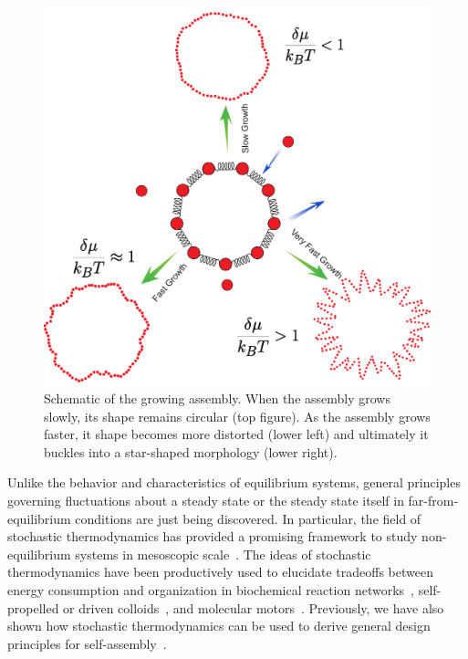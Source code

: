 \documentclass[amsmath,preprintnumbers,10pt,nofootinbib,prl,twocolumn]{revtex4-1}
\begin{document}
\begin{figure}[tbb]
\centering
\includegraphics[scale=0.35]{particleinaringschematicFig1.pdf}
\caption{Schematic of the growing assembly. When the assembly grows slowly, its shape remains circular (top figure). As the assembly grows faster, it shape becomes more distorted (lower left) and ultimately it buckles into a star-shaped morphology (lower right).} \label{fig:phases}
\end{figure}


Unlike the behavior and characteristics of equilibrium systems, general principles governing fluctuations about a steady state or the steady state itself in far-from-equilibrium conditions are just being discovered. In particular, the field of stochastic thermodynamics has provided a promising framework to study non-equilibrium systems in mesoscopic scale~\cite{Seifert2012}. The ideas of stochastic thermodynamics have been productively used to elucidate tradeoffs between energy consumption and organization in biochemical reaction networks~\cite{Barato2015,Murugan2016,Vaikunt2017}, self-propelled or driven colloids~\cite{Ganguly2013, delJunco2018,Dasbiswas2017}, and molecular motors~\cite{Gaveau2010, Seifert2011}. Previously, we have also shown how stochastic thermodynamics can be used to derive general design principles for self-assembly~\cite{Nguyen2016}. 
\end{document}
